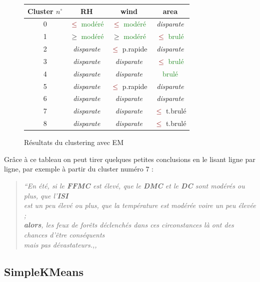 \documentclass{article}
\newcommand{\rouge}[1]{\textcolor{darkred}{#1}}
\newcommand{\quotecolor}[1]{\textcolor{quote}{#1}}
\newcommand{\forest}[1]{\textcolor{forestgreen}{#1}}
\newcommand{\firebrick}[1]{\textcolor{firebrick4}{#1}}
\begin{document}
\begin{sffamily}
\begin{figure}[h!]
\begin{center}
\begin{tabular}{|c|c|c|c|}
    \hline
    Cluster $n^\circ$ & \textbf{RH} & \textbf{wind} & \textbf{area} \\
    \hline
    0 & \rouge{$\leq$} \forest{modéré} & \rouge{$\leq$} \forest{modéré} & \textit{disparate}\\
    \hline
    1 & $\geq$ \forest{modéré} & $\geq$ \forest{modéré} & \rouge{$\leq$} \forest{brulé}\\
    \hline
    2 & \textit{disparate} & \rouge{$\leq$} \firebrick{p.rapide} & \textit{disparate}\\
    \hline
    3 & \textit{disparate} & \textit{disparate} & \rouge{$\leq$} \forest{brulé}\\
    \hline
    4 & \textit{disparate} & \textit{disparate} & \forest{brulé}\\
    \hline
    5 & \textit{disparate} & \rouge{$\leq$} \firebrick{p.rapide} & \textit{disparate}\\
    \hline
    6 & \textit{disparate} & \textit{disparate} & \textit{disparate}\\
    \hline
    7 & \textit{disparate} & \textit{disparate} & \rouge{$\leq$} \firebrick{t.brulé}\\
    \hline
    8 & \textit{disparate} & \textit{disparate} & \rouge{$\leq$} \firebrick{t.brulé}\\
    \hline
    \end{tabular}
    \caption{Résultats du clustering avec EM}
    \end{center}
\end{figure}

Grâce à ce tableau on peut tirer quelques petites conclusions en le lisant ligne par ligne, par exemple à partir du cluster numéro $7$ : 
\begin{quotation}
\textit{\quotecolor{{\Huge ``}}En été, si le \textbf{FFMC} est élevé, que le \textbf{DMC} et le \textbf{DC} sont modérés ou plus, que 
l'\textbf{ISI} \\ \indent est un peu élevé ou plus, que la température est modérée voire un peu élevée ; \\
\indent \textbf{alors}, les feux de forêts déclenchés dans ces circonstances là ont des chances d'être conséquents\\
\indent mais pas dévastateurs.\quotecolor{{\Huge ,,}}}
\end{quotation}

\subsection{SimpleKMeans}


\end{sffamily}
\end{document}
